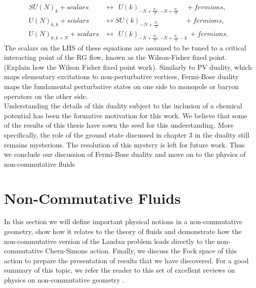             \begin{align}
                SU(N)_k + scalars &\longleftrightarrow \ \ U(k)_{-N +\frac{N_f}{2}, -N + \frac{N_f}{2}} \quad + fermions,  \\
                U(N)_{k,k} + scalars &\longleftrightarrow SU(k)_{-N +\frac{N_f}{2}}\qquad \ \ \ \quad+ fermions,  \\
                U(N)_{k,k+N} + scalars &\longleftrightarrow \ \ U(k)_{-N +\frac{N_f}{2}, -N + \frac{N_f}{2}-k} \ + fermions.  
            \end{align}
            The scalars on the LHS of these equations are assumed to be tuned to a critical interacting point of the RG flow, known as the Wilson-Fisher fixed point. (Explain how the Wilson Fisher fixed point work). Similarly to PV duality, which maps elementary excitations to non-perturbative vortices, Fermi-Bose duality maps the fundamental perturbative states on one side to monopole or baryon operators on the other side. \\
            \indent Understanding the details of this duality subject to the inclusion of a chemical potential has been the formative motivation for this work. We believe that some of the results of this thesis have sown the seed for this understanding. More specifically, the role of the ground state discussed in chapter 3 in the duality still remains mysterious. The resolution of this mystery is left for future work. Thus we conclude our discussion of Fermi-Bose duality and move on to the physics of non-commutative fluids
%
        \section{Non-Commutative Fluids}
    In this section we will define important physical notions in a non-commutative geometry, show how it relates to the theory of fluids and demonstrate how the non-commutative version of the Landau problem leads directly to the non-commutative Chern-Simons action. Finally, we discuss the Fock space of this action to prepare the presentation of results that we have discovered. For a good summary of this topic, we refer the reader to this set of excellent reviews on physics on non-commutative geometry \cite{Polychronakos:2007df, Szabo:2001kg, Douglas:2001ba}.

